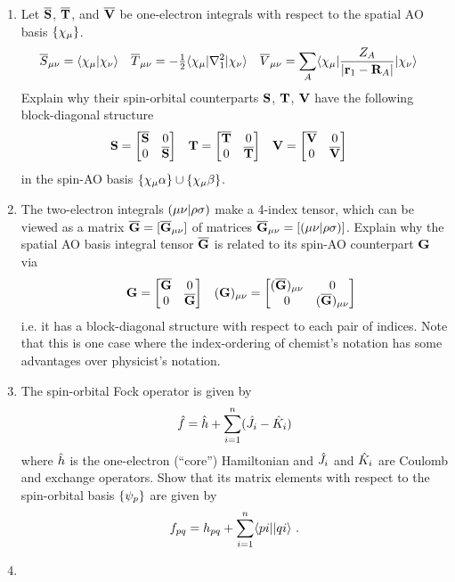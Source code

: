 \documentclass[fleqn,12pt]{article}
\begin{document}
\begin{enumerate}
  \item Let $\overline{\mathbf{S}}$, $\overline{\mathbf{T}}$, and $\overline{\mathbf{V}}$ be one-electron integrals with respect to the spatial AO basis $\{\chi_\mu\}$.
\begin{align}
\label{space-ao-ints}
&
  \overline{S}_{\mu\nu}
=
  \langle\chi_{\mu}|\chi_{\nu}\rangle
&&
  \overline{T}_{\mu\nu}
=
  -\tfrac{1}{2}\langle\chi_{\mu}|\nabla_1^2|\chi_{\nu}\rangle
&&
  \overline{V}_{\mu\nu}
=
  \sum_A\langle\chi_{\mu}|\dfrac{Z_A}{|\mathbf{r}_1-\mathbf{R}_A|}|\chi_{\nu}\rangle
\end{align}
  Explain why their spin-orbital counterparts $\mathbf{S}$, $\mathbf{T}$, $\mathbf{V}$ have the following block-diagonal structure
\begin{align}
\label{spin-ao-ints-1}
&
  \mathbf{S}
=
  \begin{bmatrix}\overline{\mathbf{S}}&0\\0&\overline{\mathbf{S}}\end{bmatrix}
&&
  \mathbf{T}
=
  \begin{bmatrix}\overline{\mathbf{T}}&0\\0&\overline{\mathbf{T}}\end{bmatrix}
&&
  \mathbf{V}
=
  \begin{bmatrix}\overline{\mathbf{V}}&0\\0&\overline{\mathbf{V}}\end{bmatrix}
\end{align}
  in the spin-AO basis $\{\chi_\mu\alpha\}\cup\{\chi_\mu\beta\}$.
  \item The two-electron integrals $(\mu\nu|\rho\sigma)$ make a 4-index tensor, which can be viewed as a matrix $\overline{\mathbf{G}}=[\overline{\mathbf{G}}_{\mu\nu}]$ of matrices $\overline{\mathbf{G}}_{\mu\nu}=[(\mu\nu|\rho\sigma)]$.
  Explain why the spatial AO basis integral tensor $\overline{\mathbf{G}}$ is related to its spin-AO counterpart $\mathbf{G}$ via
\begin{align}
&&
  \mathbf{G}
=
  \begin{bmatrix}\overline{\mathbf{G}}&0\\0&\overline{\mathbf{G}}\end{bmatrix}
&&
  (\mathbf{G})_{\mu\nu}
=
  \begin{bmatrix}(\overline{\mathbf{G}})_{\mu\nu}&0\\0&(\overline{\mathbf{G}})_{\mu\nu}\end{bmatrix}
\end{align}
  i.e. it has a block-diagonal structure with respect to each pair of indices.
  Note that this is one case where the index-ordering of chemist's notation has some advantages over physicist's notation.
  \item The spin-orbital Fock operator is given by
\begin{align}
  \hat{f}
=
  \hat{h}
+
  \sum_{i=1}^n
  (\hat{J}_i - \hat{K}_i)
\end{align}
  where $\hat{h}$ is the one-electron (``core'') Hamiltonian and $\hat{J}_i$ and $\hat{K}_i$ are Coulomb and exchange operators.
  Show that its matrix elements with respect to the spin-orbital basis $\{\psi_p\}$ are given by
\begin{align}
  f_{pq}
=
  h_{pq}
+
  \sum_{i=1}^n
  \langle pi||qi\rangle\ .
\end{align}
  \item 

\end{enumerate}
\end{document}
